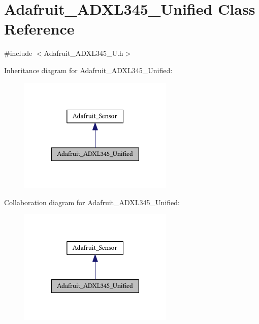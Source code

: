 \hypertarget{class_adafruit___a_d_x_l345___unified}{}\section{Adafruit\+\_\+\+A\+D\+X\+L345\+\_\+\+Unified Class Reference}
\label{class_adafruit___a_d_x_l345___unified}


{\ttfamily \#include $<$Adafruit\+\_\+\+A\+D\+X\+L345\+\_\+\+U.\+h$>$}



Inheritance diagram for Adafruit\+\_\+\+A\+D\+X\+L345\+\_\+\+Unified\+:\nopagebreak
\begin{figure}[H]
\begin{center}
\leavevmode
\includegraphics[width=209pt]{class_adafruit___a_d_x_l345___unified__inherit__graph}
\end{center}
\end{figure}


Collaboration diagram for Adafruit\+\_\+\+A\+D\+X\+L345\+\_\+\+Unified\+:\nopagebreak
\begin{figure}[H]
\begin{center}
\leavevmode
\includegraphics[width=209pt]{class_adafruit___a_d_x_l345___unified__coll__graph}
\end{center}
\end{figure}

